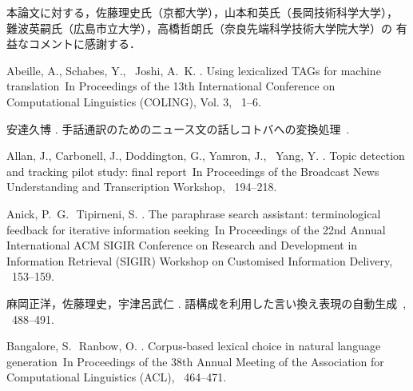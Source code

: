 本論文に対する，佐藤理史氏（京都大学），山本和英氏（長岡技術科学大学），
難波英嗣氏（広島市立大学），高橋哲朗氏（奈良先端科学技術大学院大学）の
有益なコメントに感謝する．


\newcommand{\noopsort}[1]{}
\begin{thebibliography}{}

Abeille, A., Schabes, Y., \BBA\ Joshi, A.~K. \BBCP.
\newblock \BBOQ Using lexicalized {TAG}s for machine translation\BBCQ\
\newblock In {\Bem Proceedings of the 13th International Conference on
  Computational Linguistics {\rm (}COLING\/{\rm )}, Vol. 3}, \BPGS\ 1--6.

安達久博 \BBCP.
\newblock \JBOQ 手話通訳のためのニュース文の話しコトバへの変換処理\JBCQ\
\newblock {}.

Allan, J., Carbonell, J., Doddington, G., Yamron, J., \BBA\ Yang, Y. \BBOP
  1998\BBCP.
\newblock \BBOQ Topic detection and tracking pilot study: final report\BBCQ\
\newblock In {\Bem Proceedings of the Broadcast News Understanding and
  Transcription Workshop}, \BPGS\ 194--218.

Anick, P.~G.\,\BBA\ Tipirneni, S. \BBOP 1999\BBCP.
\newblock \BBOQ The paraphrase search assistant: terminological feedback for
  iterative information seeking\BBCQ\
\newblock In {\Bem Proceedings of the 22nd Annual International ACM SIGIR
  Conference on Research and Development in Information Retrieval {\rm
  (}SIGIR\/{\rm )} Workshop on Customised Information Delivery}, \BPGS\
  153--159.

麻岡正洋，佐藤理史，宇津呂武仁 \BBOP 2004\BBCP.
\newblock \JBOQ 語構成を利用した言い換え表現の自動生成\JBCQ\
\newblock {}, \BPGS\ 488--491.

Bangalore, S.\,\BBA\ Ranbow, O. \BBCP.
\newblock \BBOQ Corpus-based lexical choice in natural language
  generation\BBCQ\
\newblock In {\Bem Proceedings of the 38th Annual Meeting of the Association
  for Computational Linguistics {\rm (}ACL\/{\rm )}}, \BPGS\ 464--471.


\end{thebibliography}
